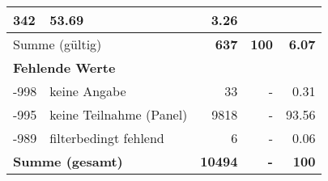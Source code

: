 \begin{longtable}{lXrrr}
       \num{342} &
       \num[round-mode=places,round-precision=2]{53.69} &
         \num[round-mode=places,round-precision=2]{3.26} \\
     \midrule
     \multicolumn{2}{l}{Summe (gültig)} &
       \textbf{\num{637}} &
     \textbf{\num{100}} &
       \textbf{\num[round-mode=places,round-precision=2]{6.07}} \\
     \multicolumn{5}{l}{\textbf{Fehlende Werte}}\\
       -998 &
       keine Angabe &
         \num{33} &
        - &
         \num[round-mode=places,round-precision=2]{0.31} \\
       -995 &
       keine Teilnahme (Panel) &
         \num{9818} &
        - &
         \num[round-mode=places,round-precision=2]{93.56} \\
       -989 &
       filterbedingt fehlend &
         \num{6} &
        - &
         \num[round-mode=places,round-precision=2]{0.06} \\
     \midrule
     \multicolumn{2}{l}{\textbf{Summe (gesamt)}} &
          \textbf{\num{10494}} &
        \textbf{-} &
        \textbf{\num{100}} \\
     \bottomrule
     \end{longtable}
     
